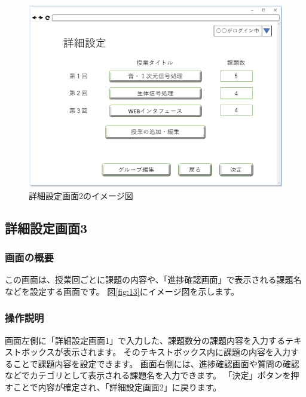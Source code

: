 \begin{figure}[htbp]
  \begin{center}
    \includegraphics[width=0.8\linewidth,clip]{./img/12.png}
    \caption{詳細設定画面2のイメージ図}\label{fig:12}
  \end{center}
\end{figure}

\newpage

\subsection{詳細設定画面3}
\subsubsection{画面の概要}
この画面は、授業回ごとに課題の内容や、「進捗確認画面」で表示される課題名などを設定する画面です。
図\ref{fig:13}にイメージ図を示します。

\subsubsection{操作説明}
画面左側に「詳細設定画面1」で入力した、課題数分の課題内容を入力するテキストボックスが表示されます。
そのテキストボックス内に課題の内容を入力することで課題内容を設定できます。
画面右側には、進捗確認画面や質問の確認などでカテゴリとして表示される課題名を入力できます。
「決定」ボタンを押すことで内容が確定され、「詳細設定画面2」に戻ります。

